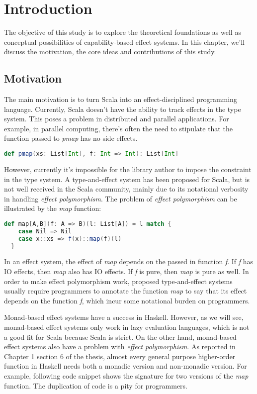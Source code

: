 \section{Introduction}

The objective of this study is to explore the theoretical foundations
as well as conceptual possibilities of capability-based effect
systems. In this chapter, we'll discuss the motivation, the core ideas
and contributions of this study.

\subsection{Motivation}

The main motivation is to turn Scala into an effect-disciplined
programming language. Currently, Scala doesn't have the ability to
track effects in the type system. This poses a problem in distributed
and parallel applications. For example, in parallel computing, there's
often the need to stipulate that the function passed to \emph{pmap}
has no side effects.

\begin{lstlisting}[language=Scala]
def pmap(xs: List[Int], f: Int => Int): List[Int]
\end{lstlisting}

However, currently it's impossible for the library author to impose
the constraint in the type system. A type-and-effect system has been
proposed for Scala\cite{lukas2014effect}, but is not well received in
the Scala community, mainly due to its notational verbosity in
handling \emph{effect polymorphism}. The problem of \emph{effect
  polymorphism} can be illustrated by the \emph{map} function:

\begin{lstlisting}[language=Scala]
  def map[A,B](f: A => B)(l: List[A]) = l match {
    case Nil => Nil
    case x::xs => f(x)::map(f)(l)
  }
\end{lstlisting}

In an effect system, the effect of \emph{map} depends on the passed in
function \emph{f}. If \emph{f} has IO effects, then \emph{map} also
has IO effects. If \emph{f} is pure, then \emph{map} is pure as
well. In order to make effect polymorphism work, proposed
type-and-effect systems usually require programmers to annotate the
function \emph{map} to say that its effect depends on the function
\emph{f}, which incur some notational burden on programmers.

Monad-based effect systems have a success in Haskell. However, as we
will see, monad-based effect systems only work in lazy evaluation
languages, which is not a good fit for Scala because Scala is
strict. On the other hand, monad-based effect systems also have a
problem with \emph{effect polymorphism}. As reported in Chapter 1
section 6 of the thesis\cite{lippmeier2009type}, almost every general
purpose higher-order function in Haskell needs both a monadic version
and non-monadic version. For example, following code snippet shows the
signature for two versions of the \emph{map} function. The duplication
of code is a pity for programmers.

